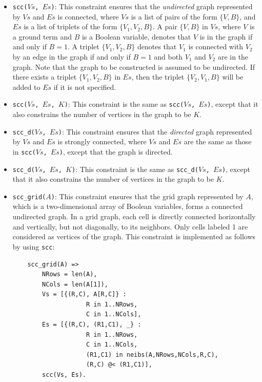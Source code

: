 \begin{itemize}
\item \texttt{scc($Vs$, $Es$)}: This constraint ensures that the \textit{undirected} graph represented by $Vs$ and $Es$ is connected, where $Vs$ is a list of pairs of the form $\{V,B\}$, and $Es$ is a list of triplets of the form $\{V_1,V_2,B\}$. A pair $\{V,B\}$ in $Vs$, where $V$ is a ground term and $B$ is a Boolean variable, denotes that $V$ is in the graph if and only if $B = 1$. A triplet $\{V_1,V_2,B\}$ denotes that $V_1$ is connected with $V_2$  by an edge in the graph if and only if $B = 1$ and both $V_1$ and $V_2$ are in the graph. Note that the graph to be constructed is assumed to be undirected. If there exists a triplet $\{V_1,V_2,B\}$ in $Es$, then the triplet $\{V_2,V_1,B\}$ will be added to $Es$ if it is not specified.

\item \texttt{scc($Vs$, $Es$, $K$)}:  This constraint is the same as \texttt{scc($Vs$, $Es$)}, except that it also constrains the number of vertices in the graph to be $K$. 

\item \texttt{scc\_d($Vs$, $Es$)}: This constraint ensures that the \textit{directed} graph represented by $Vs$ and $Es$ is strongly connected, where $Vs$ and $Es$ are the same as those in \texttt{scc($Vs$, $Es$)}, except that the graph is directed.

\item \texttt{scc\_d($Vs$, $Es$, $K$)}: This constraint is the same as \texttt{scc\_d($Vs$, $Es$)}, except that it also constrains the number of vertices in the graph to be $K$.

\item \texttt{scc\_grid($A$)}:  This constraint ensures that the grid graph represented by $A$, which is a two-dimensional array of Boolean variables, forms a connected undirected graph. In a grid graph, each cell is directly connected horizontally and vertically, but not diagonally, to its neighbors. Only cells labeled 1 are considered as vertices of the graph. This constraint is implemented as follows by using \texttt{scc}:
\begin{verbatim}
    scc_grid(A) =>
        NRows = len(A),
        NCols = len(A[1]),
        Vs = [{(R,C), A[R,C]} : 
                    R in 1..NRows, 
                    C in 1..NCols],
        Es = [{(R,C), (R1,C1), _} : 
                    R in 1..NRows, 
                    C in 1..NCols,
                    (R1,C1) in neibs(A,NRows,NCols,R,C),
                    (R,C) @< (R1,C1)],
        scc(Vs, Es).


\end{verbatim}
\end{itemize}
